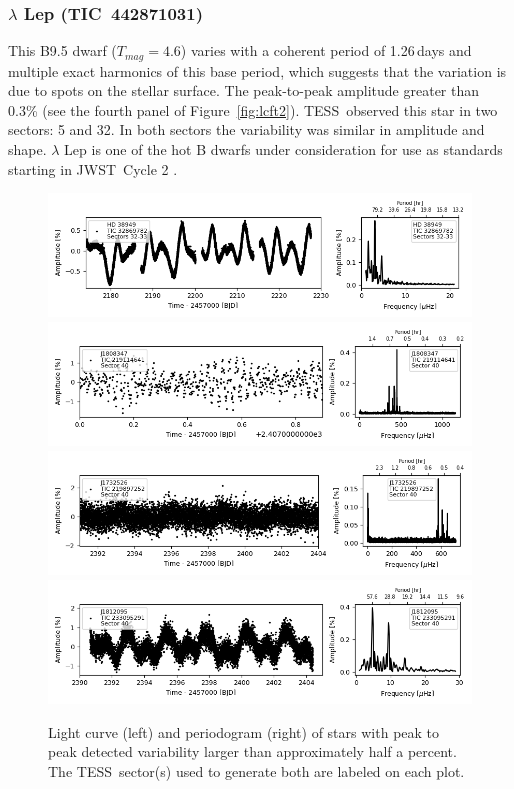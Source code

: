 \documentclass[twocolumn]{aastex631}
\newcommand{\webb}{JWST}
\newcommand{\jwst}{JWST}
\newcommand{\tess}{TESS}
\begin{document}
\subsubsection{$\lambda$ Lep (TIC~442871031)}

This B9.5 dwarf ($T_{mag}=4.6$) varies with a coherent period of 1.26\,days and multiple exact harmonics of this base period, which suggests that the variation is due to spots on the stellar surface. The peak-to-peak amplitude greater than 0.3\% (see the fourth panel of Figure~\ref{fig:lcft2}). \tess\ observed this star in two sectors: 5 and 32. In both sectors the variability was similar in amplitude and shape. $\lambda$ Lep is one of the hot B dwarfs under consideration for use as standards starting in \jwst\ Cycle 2 \citep{Gordon2022inprep}. 



\begin{figure}
    \centering
    \includegraphics[width=0.9\linewidth]{figures/tic00000032869782_s323_norm1.fits.png}
    \includegraphics[width=0.9\linewidth]{figures/tic00000219114641_s040_flat2.fits.png}
    \includegraphics[width=0.9\linewidth]{figures/tic00000219897252_s040_norm1.fits.png}
    \includegraphics[width=0.9\linewidth]{figures/tic00000233095291_s040_flat1.fits.png}
    \caption{Light curve (left) and periodogram (right) of stars with peak to peak detected variability larger than approximately half a percent. The \tess\ sector(s) used to generate both are labeled on each plot.}
    \label{fig:lcft1}
\end{figure}
\end{document}
